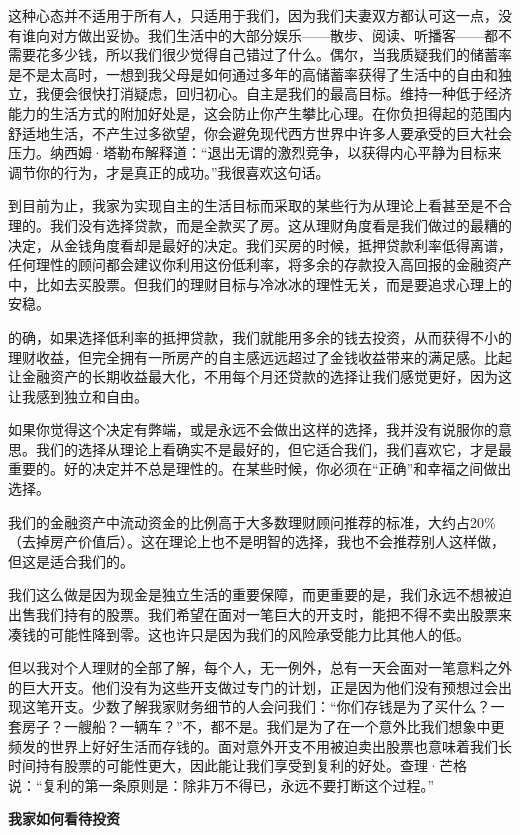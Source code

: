 这种心态并不适用于所有人，只适用于我们，因为我们夫妻双方都认可这一点，没有谁向对方做出妥协。我们生活中的大部分娱乐——散步、阅读、听播客——都不需要花多少钱，所以我们很少觉得自己错过了什么。偶尔，当我质疑我们的储蓄率是不是太高时，一想到我父母是如何通过多年的高储蓄率获得了生活中的自由和独立，我便会很快打消疑虑，回归初心。自主是我们的最高目标。维持一种低于经济能力的生活方式的附加好处是，这会防止你产生攀比心理。在你负担得起的范围内舒适地生活，不产生过多欲望，你会避免现代西方世界中许多人要承受的巨大社会压力。纳西姆·塔勒布解释道：“退出无谓的激烈竞争，以获得内心平静为目标来调节你的行为，才是真正的成功。”我很喜欢这句话。

到目前为止，我家为实现自主的生活目标而采取的某些行为从理论上看甚至是不合理的。我们没有选择贷款，而是全款买了房。这从理财角度看是我们做过的最糟的决定，从金钱角度看却是最好的决定。我们买房的时候，抵押贷款利率低得离谱，任何理性的顾问都会建议你利用这份低利率，将多余的存款投入高回报的金融资产中，比如去买股票。但我们的理财目标与冷冰冰的理性无关，而是要追求心理上的安稳。

的确，如果选择低利率的抵押贷款，我们就能用多余的钱去投资，从而获得不小的理财收益，但完全拥有一所房产的自主感远远超过了金钱收益带来的满足感。比起让金融资产的长期收益最大化，不用每个月还贷款的选择让我们感觉更好，因为这让我感到独立和自由。

如果你觉得这个决定有弊端，或是永远不会做出这样的选择，我并没有说服你的意思。我们的选择从理论上看确实不是最好的，但它适合我们，我们喜欢它，才是最重要的。好的决定并不总是理性的。在某些时候，你必须在“正确”和幸福之间做出选择。

我们的金融资产中流动资金的比例高于大多数理财顾问推荐的标准，大约占20\%（去掉房产价值后）。这在理论上也不是明智的选择，我也不会推荐别人这样做，但这是适合我们的。

我们这么做是因为现金是独立生活的重要保障，而更重要的是，我们永远不想被迫出售我们持有的股票。我们希望在面对一笔巨大的开支时，能把不得不卖出股票来凑钱的可能性降到零。这也许只是因为我们的风险承受能力比其他人的低。

但以我对个人理财的全部了解，每个人，无一例外，总有一天会面对一笔意料之外的巨大开支。他们没有为这些开支做过专门的计划，正是因为他们没有预想过会出现这笔开支。少数了解我家财务细节的人会问我们：“你们存钱是为了买什么？一套房子？一艘船？一辆车？”不，都不是。我们是为了在一个意外比我们想象中更频发的世界上好好生活而存钱的。面对意外开支不用被迫卖出股票也意味着我们长时间持有股票的可能性更大，因此能让我们享受到复利的好处。查理·芒格说：“复利的第一条原则是：除非万不得已，永远不要打断这个过程。”

\textbf{我家如何看待投资}

